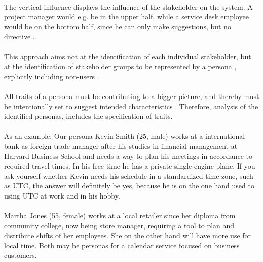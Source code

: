 \paragraph{} The vertical influence displays the influence of the stakeholder on the system. A project manager would e.g. be in the upper half, while a service desk employee would be on the bottom half, since he can only make suggestions, but no directive \parencite[cf.][38]{Robier.2016}. 

\paragraph{} This approach aims not at the identification of each individual stakeholder, but at the identification of stakeholder groups to be represented by a persona \parencite[cf.][82]{Cooper.2007}, explicitly  including non-users \parencite[cf.][84]{Cooper.2007}.

\paragraph{} All traits of a persona must be contributing to a bigger picture, and thereby must be intentionally set to suggest intended characteristics \parencite[cf.]{Platt.2016}. Therefore, analysis of the identified personas, includes the specification of traits. 

\paragraph{} As an example: Our persona Kevin Smith (25, male) works at a international bank as foreign trade manager after his studies in financial management at Harvard Business School and needs a way to plan his meetings in accordance to required travel times. In his free time he has a private single engine plane. If you ask yourself whether Kevin needs his schedule in a standardized time zone, such as UTC, the answer will definitely be yes, because he is on the one hand used to using UTC at work and in his hobby. 

\paragraph{} Martha Jones (55, female) works at a local retailer since her diploma from community college, now being store manager, requiring a tool to plan and distribute shifts of her employees. She on the other hand will have more use for local time. Both may be personas for a calendar service focused on business customers. 

